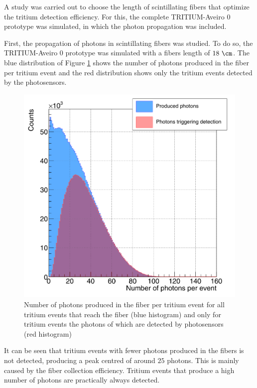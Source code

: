 A study was carried out to choose the length of scintillating fibers that optimize the tritium detection efficiency. For this, the complete TRITIUM-Aveiro 0 prototype was simulated, in which the photon propagation was included.

First, the propagation of photons in scintillating fibers was studied. To do so,  the TRITIUM-Aveiro 0 prototype was simulated with a fibers length of $18~\cm$. The blue distribution of Figure \ref{fig:PhotonsFibersYesNoPhotosensors} shows the number of photons produced in the fiber per tritium event and the red distribution shows only the tritium events detected by the photosensors.

\begin{figure}[h]
\centering
\includegraphics[scale=0.3]{Figures/8SimulationsResults/81TRITIUMDesign/813Length/CollectionPhotonsInFibers.png}
\caption{Number of photons produced in the fiber per tritium event for all tritium events that reach the fiber (blue histogram) and only for tritium events the photons of which are detected by photosensors (red histogram)\label{fig:PhotonsFibersYesNoPhotosensors}}
\end{figure}

It can be seen that tritium events with fewer photons produced in the fibers is not detected, producing a peak centred of around $25$ photons. This is mainly caused by the fiber collection efficiency. Tritium events that produce a high number of photons are practically always detected.

